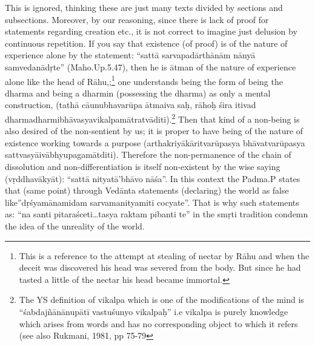 This is ignored, thinking these are just many texts divided by sections and subsections.  Moreover, by our reasoning, since there is lack of proof for statements regarding creation etc., it is not correct to imagine just delusion by continuous repetition. If you say that existence (of proof) is of the nature of experience alone by the statement: “sattā sarvapadārthānām nānyā samvedanādṛte” (Maho.Up.5.47), then he is ātman of the nature of experience alone like the head of Rāhu,;\footnote{This is a reference to the attempt at stealing of nectar by Rāhu and when the deceit was discovered his head was severed from the body. But since he had tasted a little of the nectar his head became immortal.} one understands being the form of being the dharma and being a dharmin (possessing the dharma) as only a mental construction, (tathā cāunubhavarūpa ātmaiva saḥ, rāhoḥ śira itivad dharmadharmibhāvasya\break vikalpamātratvāditi).\footnote{The YS definition of vikalpa which is one of the modifications of the mind is “śabdajñānānupātī vastuśunyo vikalpaḥ” i.e vikalpa is purely knowledge which arises from words and has no corresponding object to which it refers (see also Rukmani, 1981, pp 75-79} Then that kind of a non-being is also desired of the non-sentient by us; it is proper to have being of the nature of existence working towards a purpose (arthakriyākāritvarūpasya bhāvatvarūpasya sattvasyāivābhyupagamātditi). Therefore the non-perma\-nence of the chain of dissolution and non-differentiation is itself non-existent by the wise saying (vṛddhavākyāt): “sattā nityatā’bhāvo nāśa”. In this context the Padma.P states that (same point) through Vedānta statements (declaring) the world as false like”dṛśyamānamidam sarvamanityamiti cocyate”. That is why such statements as: “na santi pitaraśceti…tasya raktam pibanti te” in the smṛti tradition condemn the idea of the unreality of the world.


